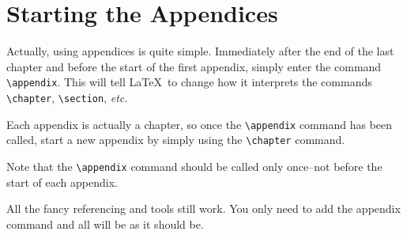 \section{Starting the Appendices}
Actually, using appendices is quite simple.  Immediately after the end
of the last chapter and before the start of the first appendix, simply
enter the command \verb|\appendix|.  This will tell \LaTeX~to change
how it interprets the commands \verb|\chapter|, \verb|\section|,
\textit{etc.}

Each appendix is actually a chapter, so once the \verb|\appendix|
command has been called, start a new appendix by simply using the
\verb|\chapter| command.

Note that the \verb|\appendix| command should be called only
once--not before the start of each appendix.

All the fancy referencing and tools still work.
You only need to add the appendix command and all will be as it should be.


